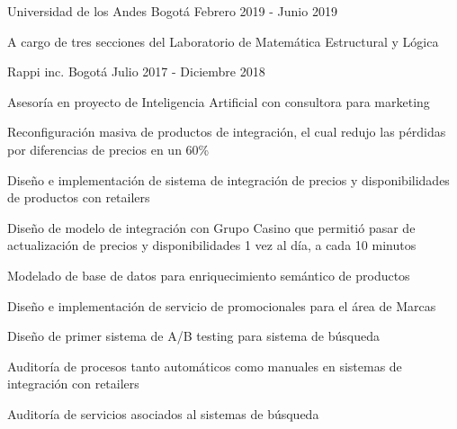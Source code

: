 


\begin{cventries}
  {Universidad de los Andes}
  {Bogotá}
  {Febrero 2019 - Junio 2019}
  {
    \begin{cvitems}
    \item{A cargo de tres secciones del Laboratorio de Matemática Estructural y Lógica}
    \end{cvitems}
  }

  {Rappi inc.} %
  {Bogotá} %
  {Julio 2017 - Diciembre 2018} %
  {
    \begin{cvitems}
    \item{Asesoría en proyecto de Inteligencia Artificial con consultora para marketing}
    \item{Reconfiguración masiva de productos de integración, el cual redujo las pérdidas por diferencias de precios en un 60\%}
    \item{Diseño e implementación de sistema de integración de precios y disponibilidades de productos con retailers}
    \item{Diseño de modelo de integración con Grupo Casino que permitió pasar de actualización de precios y disponibilidades 1 vez al día, a cada 10 minutos}
    \item{Modelado de base de datos para enriquecimiento semántico de productos}
    \item{Diseño e implementación de servicio de promocionales para el área de Marcas}
    \item{Diseño de primer sistema de A/B testing para sistema de búsqueda}
    \item{Auditoría de procesos tanto automáticos como manuales en sistemas de integración con retailers}
    \item{Auditoría de servicios asociados al sistemas de búsqueda}
   \end{cvitems}
  } %



\end{cventries}
